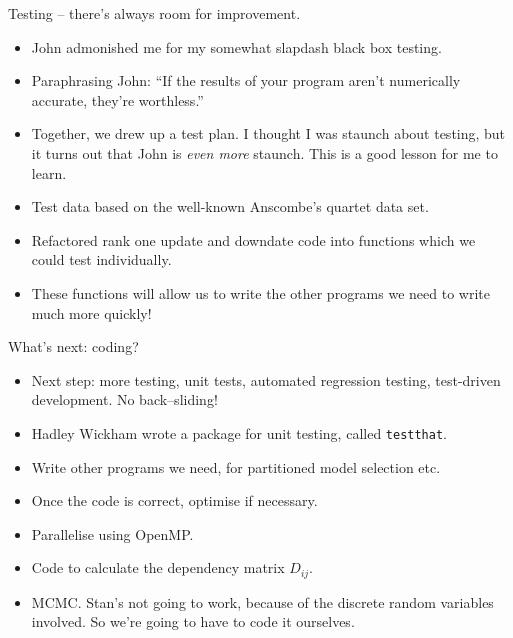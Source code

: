 \documentclass{beamer}
\begin{document}
\begin{frame}{Testing -- there's always room for improvement.}

\begin{itemize}
\item John admonished me for my somewhat slapdash black box testing.
\item Paraphrasing John: ``If the results of your program aren't numerically accurate, they're worthless.''
\item Together, we drew up a test plan. I thought I was staunch about testing, but it turns out that John is
\emph{even more} staunch. This is a good lesson for me to learn.
\item Test data based on the well-known Anscombe's quartet data set.
\item Refactored rank one update and downdate code into functions which we could test individually.
\item These functions will allow us to write the other programs we need to write much more quickly!
\end{itemize}
\end{frame}

\begin{frame}{What's next: coding?}
\begin{itemize}
\item Next step: more testing, unit tests, automated regression testing, test-driven development. No 
			back--sliding!
\item Hadley Wickham wrote a package for unit testing, called \texttt{testthat}.
\item Write other programs we need, for partitioned model selection etc.
\item Once the code is correct, optimise if necessary.
\item Parallelise using OpenMP.
\item Code to calculate the dependency matrix $D_{ij}$.
\item MCMC. Stan's not going to work, because of the discrete random variables involved. So we're going to 
			have to code it ourselves.
\end{itemize}
\end{frame}
\end{document}
